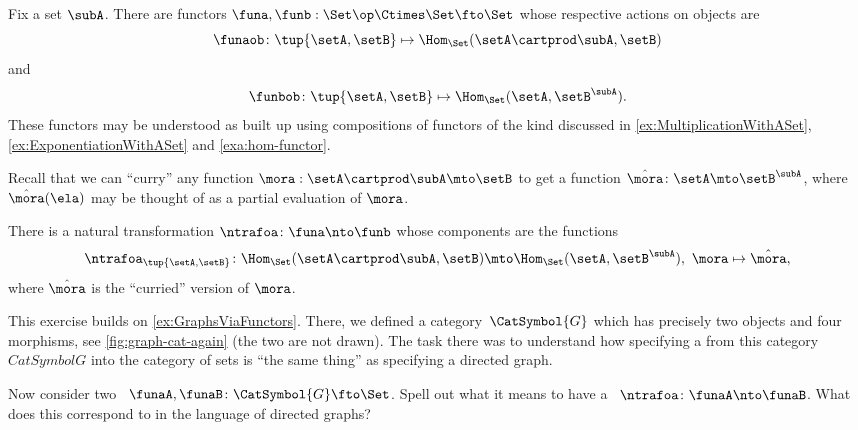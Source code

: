 \begin{example}
    Fix a set $\subA$.
    There are functors $\funa, \funb: \Set\op \Ctimes \Set \fto \Set$ whose respective actions on objects are
    \begin{equation}
        \funaob \colon \tup{\setA, \setB} \mapsto \Hom_\Set(\setA \cartprod \subA, \setB)
    \end{equation}
    and
    \begin{equation}
        \funbob \colon \tup{\setA, \setB} \mapsto \Hom_\Set(\setA, \setB^\subA).
    \end{equation}
    These functors may be understood as built up using compositions of functors of the kind discussed in \cref{ex:MultiplicationWithASet}, \cref{ex:ExponentiationWithASet} and \cref{exa:hom-functor}.

    Recall that we can ``curry'' any function $\mora : \setA \cartprod \subA \mto \setB$ to get a function $\hat \mora \colon \setA \mto \setB^\subA$, where $\hat \mora(\ela)$ may be thought of as a partial evaluation of $\mora$.

    There is a natural transformation $\ntrafoa \colon \funa \nto \funb$ whose components are the functions
    \begin{equation}\label{eq:currying-nat-trafo}
        \ntrafoa_{\tup{\setA, \setB}} \colon \Hom_\Set(\setA \cartprod \subA, \setB) \mto \Hom_\Set(\setA, \setB^\subA), \ \mora \mapsto \hat \mora,
    \end{equation}
    where $\hat \mora$ is the ``curried'' version of $\mora$.
\end{example}

\vfill

\begin{marginfigure}
    \centering
    \caption{}
    \label{fig:graph-cat-again}
\end{marginfigure}

\begin{gradedexercise}
    \label{ex:NatTrafosGraphs}
    This exercise builds on \cref{ex:GraphsViaFunctors}.
    There, we defined a category~$\CatSymbol{G}$ which has precisely two objects and four morphisms, see \cref{fig:graph-cat-again} (the two  are not drawn).
    The task there was to understand how specifying a  from this category $CatSymbol{G}$ into the category of sets is ``the same thing'' as specifying a directed graph.

    Now consider two ~$\funaA, \funaB \colon \CatSymbol{G} \fto \Set$.
    Spell out what it means to have a ~$\ntrafoa\colon \funaA \nto \funaB$.
    What does this correspond to in the language of directed graphs?
\end{gradedexercise}

